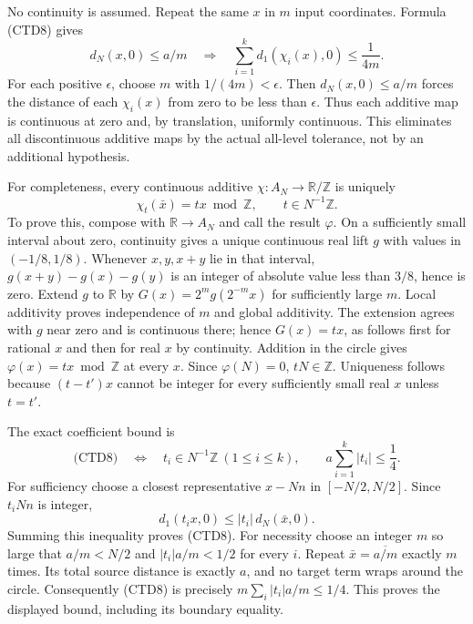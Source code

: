 No continuity is assumed. Repeat the same $x$ in $m$ input
coordinates. Formula (CTD8) gives
\begin{equation}\tag{CTD9}
d_N(x,0)\le a/m
\quad\Longrightarrow\quad
\sum_{i=1}^k d_1(\chi_i(x),0)\le\frac1{4m}.
\end{equation}
For each positive $\epsilon$, choose $m$ with $1/(4m)<\epsilon$.
Then $d_N(x,0)\le a/m$ forces the distance of each $\chi_i(x)$
from zero to be less than $\epsilon$. Thus each additive map is
continuous at zero and, by translation, uniformly continuous.
This eliminates all discontinuous additive maps by the actual
all-level tolerance, not by an additional hypothesis.

For completeness, every continuous additive
$\chi:A_N\to\mathbb R/\mathbb Z$ is uniquely
\begin{equation}\tag{CTD10}
\chi_t(\bar x)=tx\bmod\mathbb Z,\qquad t\in N^{-1}\mathbb Z.
\end{equation}
To prove this, compose with $\mathbb R\to A_N$ and call the
result $\varphi$. On a sufficiently small interval about zero,
continuity gives a unique continuous real lift $g$ with values
in $(-1/8,1/8)$. Whenever $x,y,x+y$ lie in that interval,
$g(x+y)-g(x)-g(y)$ is an integer of absolute value less than
$3/8$, hence is zero. Extend $g$ to $\mathbb R$ by
$G(x)=2^m g(2^{-m}x)$ for sufficiently large $m$.
Local additivity proves independence of $m$ and global
additivity. The extension agrees with $g$ near zero and is
continuous there; hence $G(x)=tx$, as follows first for rational
$x$ and then for real $x$ by continuity. Addition in the circle
gives $\varphi(x)=tx\bmod\mathbb Z$ at every $x$.
Since $\varphi(N)=0$, $tN\in\mathbb Z$.
Uniqueness follows because $(t-t')x$ cannot be integer for every
sufficiently small real $x$ unless $t=t'$.

The exact coefficient bound is
\begin{equation}\tag{CTD11}
\text{(CTD8)}
\quad\Longleftrightarrow\quad
t_i\in N^{-1}\mathbb Z\ (1\le i\le k),
\qquad a\sum_{i=1}^k|t_i|\le\frac14.
\end{equation}
For sufficiency choose a closest representative $x-Nn$ in
$[-N/2,N/2]$. Since $t_iNn$ is integer,
\[
d_1(t_ix,0)\le |t_i|\,d_N(\bar x,0).
\]
Summing this inequality proves (CTD8).
For necessity choose an integer $m$ so large that
$a/m<N/2$ and $|t_i|a/m<1/2$ for every $i$. Repeat
$\bar x=\overline{a/m}$ exactly $m$ times. Its total source
distance is exactly $a$, and no target term wraps around the
circle. Consequently (CTD8) is precisely
$m\sum_i|t_i|a/m\le1/4$. This proves the displayed bound,
including its boundary equality.

